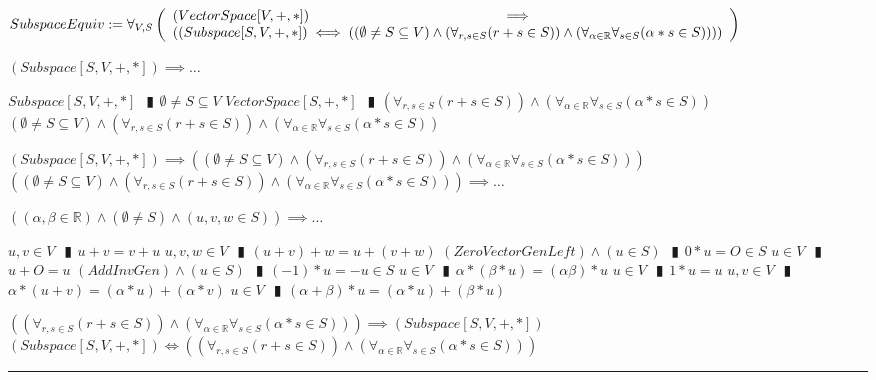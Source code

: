 \documentclass{book}
\newcommand{\abr}{:=}
\newcommand{\pipe}{$\phantom{(}\vrectangleblack\phantom{)}$}
\begin{document}
$SubspaceEquiv \abr \forall_{V, S}\left(\begin{array}{ll}
  (VectorSpace[V, +, *]) \hfill \implies \hfill \\
  ((Subspace[S, V, +, *]) \iff ((\emptyset \neq S \subseteq V) \land (\forall_{r, s \in S}(r + s \in S)) \land (\forall_{\alpha \in \mathbb{R}} \forall_{s \in S}(\alpha * s \in S))))
\end{array}\right)$
\begin{enumerate}
  \lit $(Subspace[S, V, +, *]) \implies \ldots$
  \begin{enumerate}
    \lit $Subspace[S, V, +, *]$ \pipe $\emptyset \neq S \subseteq V$
    \lit $VectorSpace[S, +, *]$ \pipe $(\forall_{r, s \in S}(r + s \in S)) \land (\forall_{\alpha \in \mathbb{R}} \forall_{s \in S}(\alpha * s \in S))$
    \lit $(\emptyset \neq S \subseteq V) \land (\forall_{r, s \in S}(r + s \in S)) \land (\forall_{\alpha \in \mathbb{R}} \forall_{s \in S}(\alpha * s \in S))$
  \end{enumerate}
  \lit $(Subspace[S, V, +, *]) \implies ((\emptyset \neq S \subseteq V) \land (\forall_{r, s \in S}(r + s \in S)) \land (\forall_{\alpha \in \mathbb{R}} \forall_{s \in S}(\alpha * s \in S)))$
  \lit $((\emptyset \neq S \subseteq V) \land (\forall_{r, s \in S}(r + s \in S)) \land (\forall_{\alpha \in \mathbb{R}} \forall_{s \in S}(\alpha * s \in S))) \implies \ldots$
  \begin{enumerate}
    \lit $((\alpha, \beta \in \mathbb{R}) \land (\emptyset \neq S) \land (u, v, w \in S)) \implies \ldots$
    \begin{enumerate}
      \lit $u, v \in V$ \pipe $u + v = v + u$
      \lit $u, v, w \in V$ \pipe $(u + v) + w = u + (v + w)$
      \lit $(ZeroVectorGenLeft) \land (u \in S)$ \pipe $0 * u = O \in S$
      \lit $u \in V$ \pipe $u + O = u$
      \lit $(AddInvGen) \land (u \in S)$ \pipe $(-1) * u = -u \in S$
      \lit $u \in V$ \pipe $\alpha * (\beta * u) = (\alpha \beta) * u$
      \lit $u \in V$ \pipe $1 * u = u$
      \lit $u, v \in V$ \pipe $\alpha * (u + v) = (\alpha * u) + (\alpha * v)$
      \lit $u \in V$ \pipe $(\alpha + \beta) * u = (\alpha * u) + (\beta * u)$
    \end{enumerate}
  \end{enumerate}
  \lit $((\forall_{r, s \in S}(r + s \in S)) \land (\forall_{\alpha \in \mathbb{R}} \forall_{s \in S}(\alpha * s \in S))) \implies (Subspace[S, V, +, *])$
  \lit $(Subspace[S, V, +, *]) \iff ((\forall_{r, s \in S}(r + s \in S)) \land (\forall_{\alpha \in \mathbb{R}} \forall_{s \in S}(\alpha * s \in S)))$
\end{enumerate} \vspace{.75mm} \hrule \vspace{.75mm} \ \\ 
\end{document}
